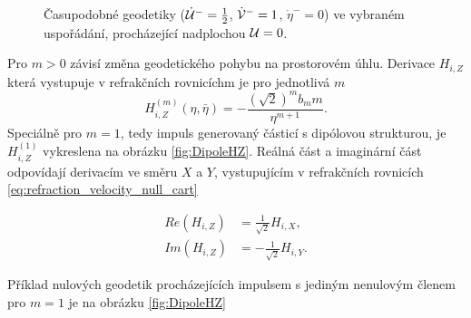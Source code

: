 \begin{figure}[ht]
    \centering
    \caption{Časupodobné geodetiky ($\dot {\mathcal{U}}^-=\frac{1}{2}$, $\dot {\mathcal{V}}^-=1$, $\dot \eta^-=0$) ve vybraném uspořádání, procházející nadplochou $\mathcal{U} = 0$.}
    \label{fig:AsMatterNonAxial}
\end{figure}
Pro $m>0$ závisí změna geodetického pohybu na prostorovém úhlu. Derivace $H_{i,Z}$ která vystupuje v refrakčních rovnicíchm je pro jednotlivá $m$
\begin{equation}
    H_{i,Z}^{(m)}(\eta, \bar{\eta}) = -\frac{(\sqrt{2})^{m} b_m m}{\eta^{m+1}}.
\end{equation}
Speciálně pro $m=1$, tedy impuls generovaný částicí s dipólovou strukturou, je $H_{i,Z}^{(1)}$ vykreslena na obrázku \ref{fig:DipoleHZ}. Reálná část a imaginární část
odpovídají derivacím ve směru $X$ a $Y$, vystupujícím v refrakčních rovnicích \eqref{eq:refraction_velocity_null_cart}

\begin{equation}
    \begin{split}
        Re(H_{i,Z}) &= \frac{1}{\sqrt{2}} H_{i,X}, \\
        Im(H_{i,Z}) &=-\frac{1}{\sqrt{2}}H_{i,Y}.
    \end{split}
\end{equation}


Příklad nulových geodetik procházejících impulsem s jediným nenulovým členem pro $m=1$ je na obrázku \ref{fig:DipoleHZ}

